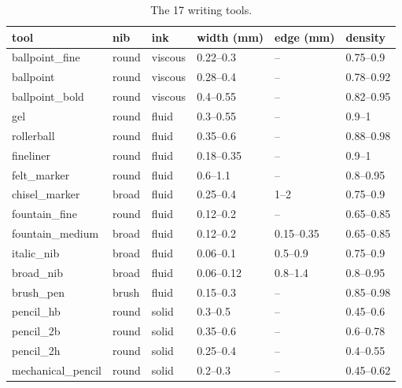 \begin{table}[h]\centering\footnotesize
\begin{tabular}{llllll}\toprule tool & nib & ink & width (mm) & edge (mm) & density\\\midrule
ballpoint\_fine & round & viscous & 0.22--0.3 & -- & 0.75--0.9\\
ballpoint & round & viscous & 0.28--0.4 & -- & 0.78--0.92\\
ballpoint\_bold & round & viscous & 0.4--0.55 & -- & 0.82--0.95\\
gel & round & fluid & 0.3--0.55 & -- & 0.9--1\\
rollerball & round & fluid & 0.35--0.6 & -- & 0.88--0.98\\
fineliner & round & fluid & 0.18--0.35 & -- & 0.9--1\\
felt\_marker & round & fluid & 0.6--1.1 & -- & 0.8--0.95\\
chisel\_marker & broad & fluid & 0.25--0.4 & 1--2 & 0.75--0.9\\
fountain\_fine & round & fluid & 0.12--0.2 & -- & 0.65--0.85\\
fountain\_medium & broad & fluid & 0.12--0.2 & 0.15--0.35 & 0.65--0.85\\
italic\_nib & broad & fluid & 0.06--0.1 & 0.5--0.9 & 0.75--0.9\\
broad\_nib & broad & fluid & 0.06--0.12 & 0.8--1.4 & 0.8--0.95\\
brush\_pen & brush & fluid & 0.15--0.3 & -- & 0.85--0.98\\
pencil\_hb & round & solid & 0.3--0.5 & -- & 0.45--0.6\\
pencil\_2b & round & solid & 0.35--0.6 & -- & 0.6--0.78\\
pencil\_2h & round & solid & 0.25--0.4 & -- & 0.4--0.55\\
mechanical\_pencil & round & solid & 0.2--0.3 & -- & 0.45--0.62\\
\bottomrule\end{tabular}
\caption{The 17 writing tools.}
\label{tab:tools}\end{table}
